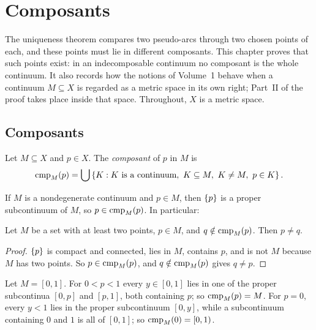 \chapter{Composants}\label{ch:composants}

The uniqueness theorem compares two pseudo-arcs through two chosen points of each, and these
points must lie in different composants. This chapter proves that such points exist: in an
indecomposable continuum no composant is the whole continuum. It also records how the
notions of Volume~1 behave when a continuum $M\subseteq X$ is regarded as a metric space in
its own right; Part~II of the proof takes place inside that space. Throughout, $X$ is a metric
space.

\section{Composants}

\begin{definition}\label{def:composant}
Let $M\subseteq X$ and $p\in X$. The \emph{composant} of $p$ in $M$ is
\[
\operatorname{cmp}_{M}(p)=\bigcup\left\{ K : K\text{ is a continuum},\ K\subseteq M,\ K\neq M,\ p\in K \right\}.
\]
\end{definition}


If $M$ is a nondegenerate continuum and $p\in M$, then $\left\{ p \right\}$ is a proper subcontinuum of $M$,
so $p\in\operatorname{cmp}_{M}(p)$. In particular:

\begin{lemma}\label{lem:ne-of-composant}
Let $M$ be a set with at least two points, $p\in M$, and $q\notin\operatorname{cmp}_{M}(p)$. Then $p\neq q$.
\end{lemma}

\begin{proof}
$\left\{ p \right\}$ is compact and connected, lies in $M$, contains $p$, and is not $M$ because $M$ has
two points. So $p\in\operatorname{cmp}_{M}(p)$, and $q\notin\operatorname{cmp}_{M}(p)$ gives $q\neq p$.
\end{proof}


\begin{example}
Let $M=[0,1]$. For $0<p<1$ every $y\in[0,1]$ lies in one of the proper subcontinua $[0,p]$ and
$[p,1]$, both containing $p$; so $\operatorname{cmp}_{M}(p)=M$. For $p=0$, every $y<1$ lies in the proper subcontinuum
$[0,y]$, while a subcontinuum containing $0$ and $1$ is all of $[0,1]$; so $\operatorname{cmp}_{M}(0)=[0,1)$.
\end{example}

